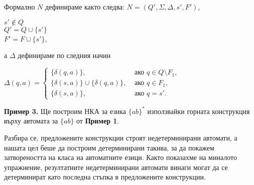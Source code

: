 \documentclass{article}
\begin{document}
\hspace{15pt} Формално $N$ дефинираме както следва:
     $N = (Q',\Sigma,\Delta,s',F')$,
     \begin{center}
      $s' \notin Q$ \\
      $Q' = Q \cup \{s'\}$ \\
      $F' = F \cup \{s'\}$,
     \end{center} 
      
     а $\Delta$ дефинираме по следния начин

     \begin{center}
        $\Delta(q,a) =
        \begin{cases}
          \{\delta(q,a)\}, & \text { ако } q \in Q \setminus F_1, \\
          \{\delta(s,a)\} \cup \{\delta(q,a)\}, & \text { ако } q \in F_1, \\
          \{\delta(s,a)\}, & \text { ако } q = s'.
        \end{cases}$
     \end{center}

\vspace{15pt}

\textbf{Пример 3.} Ще построим НКА за езика $\{ab\}^*$ използвайки 
горната конструкция върху автомата за $\{ab\}$ от \textbf{Пример 1}.

\vspace{15pt}

\begin{center}
    \end{center}

\vspace{15pt}

Разбира се, предложените конструкции строят недетерминирани автомати, а нашата цел
беше да построим детерминирани такива, за да покажем затвореността на класа на
автоматните езици. Както показахме на миналото упражнение, резултатните недетерминирани
автомати винаги могат да се детерминират като последна стъпка в предложените конструкции.
\end{document}
